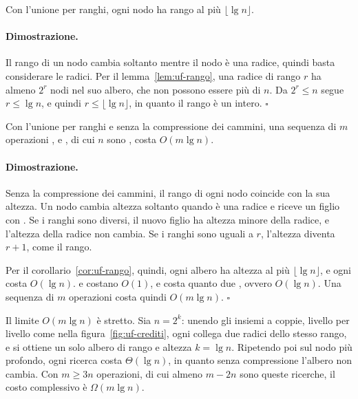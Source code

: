 \begin{corollario}\label{cor:uf-rango}
Con l'unione per ranghi, ogni nodo ha rango al più $\lfloor \lg n \rfloor$.
\end{corollario}

\paragraph{Dimostrazione.}
Il rango di un nodo cambia soltanto mentre il nodo è una radice, quindi basta considerare le radici. Per il lemma~\ref{lem:uf-rango}, una radice di rango $r$ ha almeno $2^r$ nodi nel suo albero, che non possono essere più di $n$. Da $2^r \le n$ segue $r \le \lg n$, e quindi $r \le \lfloor \lg n \rfloor$, in quanto il rango è un intero. \hfill $\square$

\begin{teorema}\label{teo:uf-solo-ranghi}
Con l'unione per ranghi e senza la compressione dei cammini, una sequenza di $m$ operazioni \MakeSet{}, \Union{} e \FindSet{}, di cui $n$ sono \MakeSet{}, costa $O(m \lg n)$.
\end{teorema}

\paragraph{Dimostrazione.}
Senza la compressione dei cammini, il rango di ogni nodo coincide con la sua altezza. Un nodo cambia altezza soltanto quando è una radice e riceve un figlio con \Link{}. Se i ranghi sono diversi, il nuovo figlio ha altezza minore della radice, e l'altezza della radice non cambia. Se i ranghi sono uguali a $r$, l'altezza diventa $r + 1$, come il rango.

Per il corollario~\ref{cor:uf-rango}, quindi, ogni albero ha altezza al più $\lfloor \lg n \rfloor$, e ogni \FindSet{} costa $O(\lg n)$. \MakeSet{} e \Link{} costano $O(1)$, e \Union{} costa quanto due \FindSet{}, ovvero $O(\lg n)$. Una sequenza di $m$ operazioni costa quindi $O(m \lg n)$. \hfill $\square$

\begin{osservazione}
Il limite $O(m \lg n)$ è stretto. Sia $n = 2^k$: unendo gli insiemi a coppie, livello per livello come nella figura~\ref{fig:uf-crediti}, ogni \Link{} collega due radici dello stesso rango, e si ottiene un solo albero di rango e altezza $k = \lg n$. Ripetendo poi \FindSet{} sul nodo più profondo, ogni ricerca costa $\Theta(\lg n)$, in quanto senza compressione l'albero non cambia. Con $m \ge 3n$ operazioni, di cui almeno $m - 2n$ sono queste ricerche, il costo complessivo è $\Omega(m \lg n)$.
\end{osservazione}

